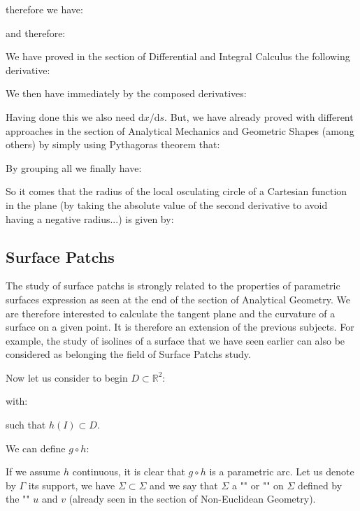 {	\pagebreak
	\begin{tcolorbox}[colframe=black,colback=white,sharp corners]
	therefore we have:
	
	and therefore:
	
	We have proved in the section of Differential and Integral Calculus the following derivative:	
	
	We then have immediately by the composed derivatives:
	
	Having done this we also need $\mathrm{d}x/\mathrm{d}s$. But, we have already proved with different approaches in the section of Analytical Mechanics and Geometric Shapes (among others) by simply using Pythagoras theorem that:
	
	By grouping all we finally have:
	
	So it comes that the radius of the local osculating circle of a Cartesian function in the plane (by taking the absolute value of the second derivative to avoid having a negative radius...) is given by\label{radius of curvature}:
	
	\end{tcolorbox}
	
	\pagebreak
	\subsection{Surface Patchs}
	The study of surface patchs is strongly related to the properties of parametric surfaces expression as seen at the end of the section of Analytical Geometry. We are therefore interested to calculate the tangent plane and the curvature of a surface on a given point. It is therefore an extension of the previous subjects. For example, the study of isolines of a surface that we have seen earlier can also be considered as belonging the field of Surface Patchs study.
	 
	Now let us consider to begin $D \subset \mathbb{R}^2$:
	
	with:
	
	such that $h(I)\subset D$.

	We can define $g\circ h$:
	
	If we assume $h$ continuous, it is clear that $g\circ h$ is a parametric arc. Let us denote by $\Gamma$ its support, we have $\Sigma \subset \Sigma$ and we say that $\Sigma$ a "" or "" on $\Sigma$ defined by the "" $u$ and $v$ (already seen in the section of Non-Euclidean Geometry).
	
}
